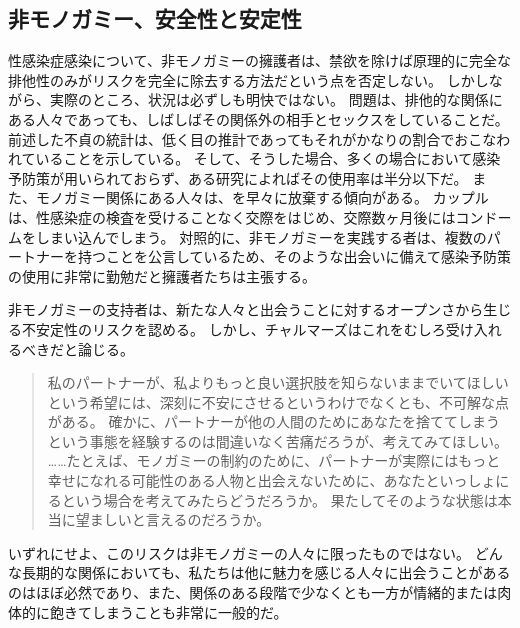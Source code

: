 \documentclass[paper=a4,book,openany]{jlreq} \usepackage{mystyle}
\begin{document}
\subsection{非モノガミー、安全性と安定性}

性感染症感染について、非モノガミーの擁護者は、禁欲を除けば原理的に完全な排他性のみがリスクを完全に除去する方法だという点を否定しない。
しかしながら、実際のところ、状況は必ずしも明快ではない。
問題は、排他的な関係にある人々であっても、しばしばその関係外の相手とセックスをしていることだ。
前述した不貞の統計は、低く目の推計であってもそれがかなりの割合でおこなわれていることを示している。
そして、そうした場合、多くの場合において感染予防策が用いられておらず、ある研究によればその使用率は半分以下だ\citep{conley12:_unfait_indiv_are_less_likel}。
また、モノガミー関係にある人々は、を早々に放棄する傾向がある。
カップルは、性感染症の検査を受けることなく交際をはじめ、交際数ヶ月後にはコンドームをしまい込んでしまう\citep{glauser11:_how_talk_patien_sti_screen}。
対照的に、非モノガミーを実践する者は、複数のパートナーを持つことを公言しているため、そのような出会いに備えて感染予防策の使用に非常に勤勉だと擁護者たちは主張する\citep{soh16:_insig_kinky_nonmon_sex}。

非モノガミーの支持者は、新たな人々と出会うことに対するオープンさから生じる不安定性のリスクを認める。
しかし、チャルマーズはこれをむしろ受け入れるべきだと論じる。

\begin{quote}
私のパートナーが、私よりもっと良い選択肢を知らないままでいてほしいという希望には、深刻に不安にさせるというわけでなくとも、不可解な点がある。
確かに、パートナーが他の人間のためにあなたを捨ててしまうという事態を経験するのは間違いなく苦痛だろうが、考えてみてほしい。
……たとえば、モノガミーの制約のために、パートナーが実際にはもっと幸せになれる可能性のある人物と出会えないために、あなたといっしょにるという場合を考えてみたらどうだろうか。
果たしてそのような状態は本当に望ましいと言えるのだろうか。
\citep{chalmers19:_is_monog_moral_permis}
\end{quote}

いずれにせよ、このリスクは非モノガミーの人々に限ったものではない。
どんな長期的な関係においても、私たちは他に魅力を感じる人々に出会うことがあるのはほぼ必然であり、また、関係のある段階で少なくとも一方が情緒的または肉体的に飽きてしまうことも非常に一般的だ。
\end{document}

